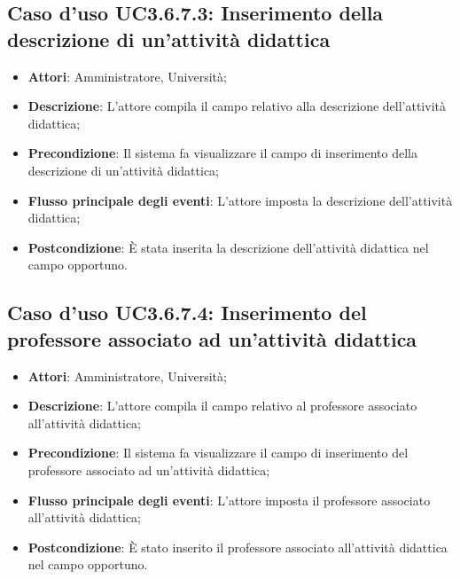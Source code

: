 \subsection{Caso d'uso \texorpdfstring{UC3.6.7.3}{UC3.6.7.3}: Inserimento della descrizione di un'attività didattica}
\begin{itemize}
\item \textbf{Attori}: Amministratore, Università;
\item \textbf{Descrizione}: L'attore compila il campo relativo alla descrizione dell'attività didattica;

\item \textbf{Precondizione}: Il sistema fa visualizzare il campo di inserimento della descrizione di un'attività didattica;

\item \textbf{Flusso principale degli eventi}: L'attore imposta la descrizione dell'attività didattica;

\item \textbf{Postcondizione}: È stata inserita la descrizione dell'attività didattica nel campo opportuno.

\end{itemize}
\subsection{Caso d'uso \texorpdfstring{UC3.6.7.4}{UC3.6.7.4}: Inserimento del professore associato ad un'attività didattica}
\begin{itemize}
\item \textbf{Attori}: Amministratore, Università;
\item \textbf{Descrizione}: L'attore compila il campo relativo al professore associato all'attività didattica;

\item \textbf{Precondizione}: Il sistema fa visualizzare il campo di inserimento del professore associato ad un'attività didattica;
\item \textbf{Flusso principale degli eventi}: L'attore imposta il professore associato all'attività didattica;

\item \textbf{Postcondizione}: È stato inserito il professore associato all'attività didattica nel campo opportuno.

\end{itemize}
